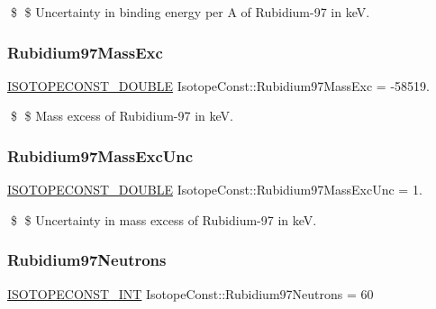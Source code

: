 \$ \$ Uncertainty in binding energy per A of Rubidium-\/97 in keV. \mbox{\label{group___isotope_const-_rubidium-_rb97_ga52166e0a208c4f3b1c4b1be0e310ec63}} 
\subsubsection{\texorpdfstring{Rubidium97\+Mass\+Exc}{Rubidium97MassExc}}
{\footnotesize\ttfamily \mbox{\hyperlink{group___isotope_const-_macros_ga8f45a7272ce02c0b4c65c44636ed719a}{I\+S\+O\+T\+O\+P\+E\+C\+O\+N\+S\+T\+\_\+\+D\+O\+U\+B\+LE}} Isotope\+Const\+::\+Rubidium97\+Mass\+Exc = -\/58519.}

\$ \$ Mass excess of Rubidium-\/97 in keV. \mbox{\label{group___isotope_const-_rubidium-_rb97_ga385c18ae7dbb2995bff802e0be5bcfd7}} 
\subsubsection{\texorpdfstring{Rubidium97\+Mass\+Exc\+Unc}{Rubidium97MassExcUnc}}
{\footnotesize\ttfamily \mbox{\hyperlink{group___isotope_const-_macros_ga8f45a7272ce02c0b4c65c44636ed719a}{I\+S\+O\+T\+O\+P\+E\+C\+O\+N\+S\+T\+\_\+\+D\+O\+U\+B\+LE}} Isotope\+Const\+::\+Rubidium97\+Mass\+Exc\+Unc = 1.}

\$ \$ Uncertainty in mass excess of Rubidium-\/97 in keV. \mbox{\label{group___isotope_const-_rubidium-_rb97_ga368dac949cf9b2c9cf05f7130b2a04c6}} 
\subsubsection{\texorpdfstring{Rubidium97\+Neutrons}{Rubidium97Neutrons}}
{\footnotesize\ttfamily \mbox{\hyperlink{group___isotope_const-_macros_ga5f18360b3e99483a35c32d789e62621c}{I\+S\+O\+T\+O\+P\+E\+C\+O\+N\+S\+T\+\_\+\+I\+NT}} Isotope\+Const\+::\+Rubidium97\+Neutrons = 60}

